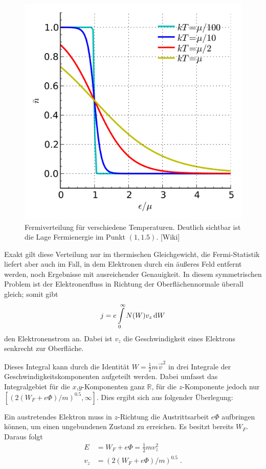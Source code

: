  \begin{figure}[H]
    \centering
    \includegraphics[width=0.4\textheight]{../figures/fermi.png}
    \caption{Fermiverteilung für verschiedene Temperaturen. Deutlich sichtbar ist die Lage Fermienergie im Punkt $(1,1.5)$. [Wiki]}
    \label{fig:aufbau}
  \end{figure}

  Exakt gilt diese Verteilung nur im thermischen Gleichgewicht, die Fermi-Statistik liefert aber auch im Fall, in dem Elektronen durch ein äußeres Feld entfernt werden, noch Ergebnisse mit ausreichender Genauigkeit.
  In diesem symmetrischen Problem ist der Elektronenfluss in Richtung der Oberflächennormale überall gleich; somit gibt
  \begin{align}\label{equ:electronflux}
    j = e \integral{N(W) v_z}{W}{0}{\infty}
  \end{align}
  den Elektronenstrom an. Dabei ist $v_z$ die Geschwindigkeit eines Elektrons senkrecht zur Oberfläche.

  Dieses Integral kann durch die Identität $W=\frac{1}{2} m \vec{v}^2$ in drei Integrale der Geschwindigkeitskomponenten aufgeteilt werden. Dabei umfasst das Integralgebiet für die $x$,$y$-Komponenten ganz $\mathds{R}$, für die $z$-Komponente jedoch nur $[(2(W_F+e \Phi)/m)^{0.5},\infty]$. Dies ergibt sich aus folgender Überlegung:
  \par
  Ein austretendes Elektron muss in $z$-Richtung die Austrittsarbeit $e\Phi$ aufbringen können, um einen ungebundenen Zustand zu erreichen. Es besitzt bereits $W_F$. Daraus folgt
  \begin{align}\label{equ:minwork}
    E   &= W_F + e\Phi = \frac{1}{2} m v_z^2\\
    v_z &= (2(W_F+e \Phi)/m)^{0.5} \;.
  \end{align}
  \par

